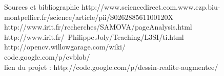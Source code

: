 \documentclass{beamer}
\begin{document}
	\begin{frame}{Sources et bibliographie}
  http://www.sciencedirect.com.www.ezp.biu-montpellier.fr/science/article/pii/S026288561100120X \\
  http://www.irit.fr/recherches/SAMOVA/pageAnalysis.html\\
  http://www.irit.fr/~Philippe.Joly/Teaching/L3SI/ti.html\\
  http://opencv.willowgarage.com/wiki/\\
  code.google.com/p/cvblob/ \\
  lien du projet : http://code.google.com/p/dessin-realite-augmentee/ \\
	\end{frame}
\end{document}
